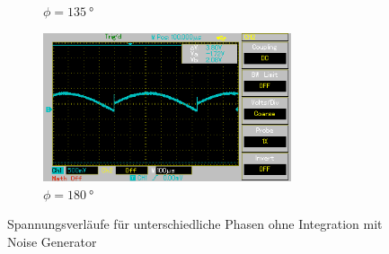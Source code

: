 \begin{figure}
\begin{subfigure}{0.5\textwidth}
    \caption{$\phi = \qty[]{135}{\degree}$}%
    \label{fig:phase9}%
    \end{subfigure}%
    \hfill
    \begin{subfigure}{0.5\textwidth}%
    \centering%
    \includegraphics[width = 7.3cm]{./Oszilloskop Bilder/png/5.3/n5.png}%
    \caption{$\phi = \qty[]{180}{\degree}$}%
    \label{fig:phase10}%
    \end{subfigure}%
    \caption{Spannungsverläufe für unterschiedliche Phasen ohne Integration mit Noise Generator}%
    \label{fig:phasenunterschiede_mit_noise}%
\end{figure}%

